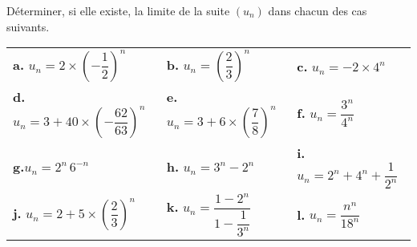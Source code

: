 \documentclass[11pt,fleqn, openany]{book} %
\begin{document}
\begin{exercise}[topic=lim12] Déterminer, si elle existe, la limite de la suite $(u_n)$ dans chacun des cas suivants.

\begin{center}
\begin{tabularx}{\linewidth}{XXX}
\textbf{a.} $ u_n = 2 \times \left(-\dfrac{1}{2}\right)^n$ & \textbf{b.} $u_n=\left(\dfrac{2}{3}\right)^n$ &
\textbf{c.} $u_n=-2\times 4^n$ \\
\textbf{d.} $u_n=3+40\times\left(-\dfrac{62}{63}\right)^n$ &\textbf{e.} $ u_n = 3+6\times \left(\dfrac{7}{8}\right)^n$ &\textbf{f.} $u_n=\dfrac{3^n}{4^n}$\\
\textbf{g.}$ u_n = 2^n\, 6^{-n}$ &\textbf{h.} $ u_n = 3^n-2^n$ &
\textbf{i.} $u_n=2^n + 4^n  + \dfrac{1}{2^n}$ \\ \textbf{j.} $u_n = 2+5\times \left( \dfrac{2}{3}\right)^n$ &
\textbf{k.} $u_n=\dfrac{1-2^{n}}{1-\dfrac{1}{3^n}}$ &\textbf{l.}  $u_n=\dfrac{n^n}{18^n}$

\end{tabularx}
\end{center}\end{exercise}
\end{document}
